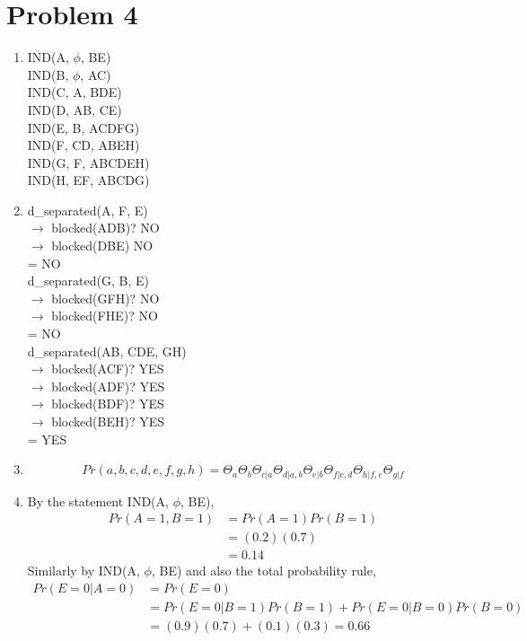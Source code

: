 \documentclass{article}
\begin{document}
\section*{Problem 4}
\begin{enumerate} [label=(\alph*)]
\item 
	IND(A, $\phi$, BE) \\ IND(B, $\phi$, AC) \\ IND(C, A, BDE) \\ IND(D, AB, CE) \\
	IND(E, B, ACDFG) \\ IND(F, CD, ABEH) \\ IND(G, F, ABCDEH) \\ IND(H, EF, ABCDG)
\item
	d_separated(A, F, E) \\
	$\rightarrow$ blocked(ADB)? NO \\
	$\rightarrow$ blocked(DBE) NO \\
	= NO \\
	
	d_separated(G, B, E) \\
	$\rightarrow$  blocked(GFH)? NO \\
	$\rightarrow$  blocked(FHE)? NO \\
	= NO \\
	
	d_separated(AB, CDE, GH) \\
	$\rightarrow$  blocked(ACF)? YES \\
	$\rightarrow$  blocked(ADF)? YES \\
	$\rightarrow$  blocked(BDF)? YES \\
	$\rightarrow$  blocked(BEH)? YES \\
	= YES
\item
	\begin{equation*}
		Pr(a, b, c, d, e, f, g, h) = \Theta_a \Theta_b \Theta_{c|a} \Theta_{d|a,b} 
			\Theta_{e|b} \Theta_{f|c,d} \Theta_{h|f,e} \Theta_{g|f}
	\end{equation*}
\item
	By the statement IND(A, $\phi$, BE), \begin{align*}
		Pr(A=1, B=1) 
			&= Pr(A=1) Pr(B=1) \\
			&= (0.2) (0.7) \\
			&= 0.14 \end{align*}
	Similarly by IND(A, $\phi$, BE) and also the total probability rule, \begin{align*}
		Pr(E=0|A=0) 
			&= Pr(E=0) \\
			&= Pr(E=0 | B=1) Pr(B=1) + Pr(E=0|B=0) Pr(B=0) \\
			 &= (0.9)(0.7) + (0.1)(0.3) = 0.66 \end{align*}
\end{enumerate}
\clearpage
\end{document}
